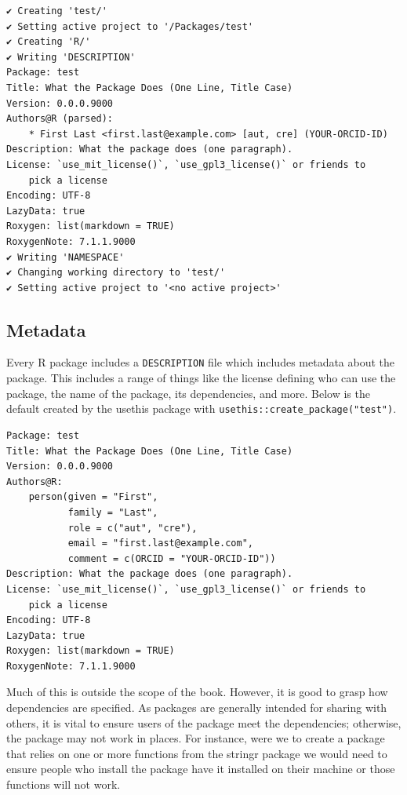 \documentclass[10pt,]{krantz}
\begin{document}
\begin{verbatim}
✔ Creating 'test/'
✔ Setting active project to '/Packages/test'
✔ Creating 'R/'
✔ Writing 'DESCRIPTION'
Package: test
Title: What the Package Does (One Line, Title Case)
Version: 0.0.0.9000
Authors@R (parsed):
    * First Last <first.last@example.com> [aut, cre] (YOUR-ORCID-ID)
Description: What the package does (one paragraph).
License: `use_mit_license()`, `use_gpl3_license()` or friends to
    pick a license
Encoding: UTF-8
LazyData: true
Roxygen: list(markdown = TRUE)
RoxygenNote: 7.1.1.9000
✔ Writing 'NAMESPACE'
✔ Changing working directory to 'test/'
✔ Setting active project to '<no active project>'
\end{verbatim}

\hypertarget{basics-metadata}{%
\subsection{Metadata}\label{basics-metadata}}

Every R package includes a \texttt{DESCRIPTION} file which includes metadata about the package. This includes a range of things like the license defining who can use the package, the name of the package, its dependencies, and more. Below is the default created by the usethis package with \texttt{usethis::create\_package("test")}.

\begin{verbatim}
Package: test
Title: What the Package Does (One Line, Title Case)
Version: 0.0.0.9000
Authors@R: 
    person(given = "First",
           family = "Last",
           role = c("aut", "cre"),
           email = "first.last@example.com",
           comment = c(ORCID = "YOUR-ORCID-ID"))
Description: What the package does (one paragraph).
License: `use_mit_license()`, `use_gpl3_license()` or friends to
    pick a license
Encoding: UTF-8
LazyData: true
Roxygen: list(markdown = TRUE)
RoxygenNote: 7.1.1.9000
\end{verbatim}

Much of this is outside the scope of the book. However, it is good to grasp how dependencies are specified. As packages are generally intended for sharing with others, it is vital to ensure users of the package meet the dependencies; otherwise, the package may not work in places. For instance, were we to create a package that relies on one or more functions from the stringr \citep{R-stringr} package we would need to ensure people who install the package have it installed on their machine or those functions will not work.
\end{document}
